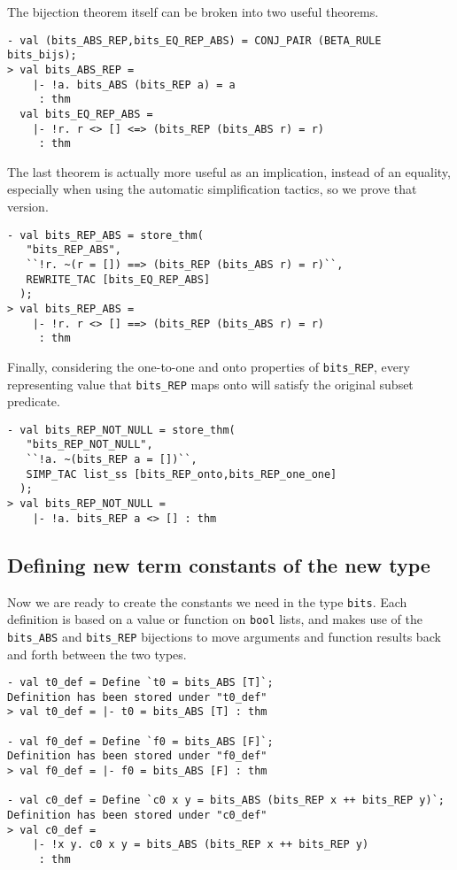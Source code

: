 The bijection theorem itself can be broken into two useful theorems.
%
\begin{session}
\begin{verbatim}
- val (bits_ABS_REP,bits_EQ_REP_ABS) = CONJ_PAIR (BETA_RULE bits_bijs);
> val bits_ABS_REP =
    |- !a. bits_ABS (bits_REP a) = a
     : thm
  val bits_EQ_REP_ABS =
    |- !r. r <> [] <=> (bits_REP (bits_ABS r) = r)
     : thm
\end{verbatim}
\end{session}

The last theorem is actually more useful as an implication, instead of an equality,
especially when using the automatic simplification tactics,
so we prove that version.
%
\begin{session}
\begin{verbatim}
- val bits_REP_ABS = store_thm(
   "bits_REP_ABS",
   ``!r. ~(r = []) ==> (bits_REP (bits_ABS r) = r)``,
   REWRITE_TAC [bits_EQ_REP_ABS]
  );
> val bits_REP_ABS =
    |- !r. r <> [] ==> (bits_REP (bits_ABS r) = r)
     : thm
\end{verbatim}
\end{session}

Finally, considering the
one-to-one and onto
properties of
\texttt{bits\_REP}, every representing value that \texttt{bits\_REP} maps onto will
satisfy the original subset predicate.
%
\begin{session}
\begin{verbatim}
- val bits_REP_NOT_NULL = store_thm(
   "bits_REP_NOT_NULL",
   ``!a. ~(bits_REP a = [])``,
   SIMP_TAC list_ss [bits_REP_onto,bits_REP_one_one]
  );
> val bits_REP_NOT_NULL =
    |- !a. bits_REP a <> [] : thm
\end{verbatim}
\end{session}

\subsection{Defining new term constants of the new type}

Now we are ready to create the constants we need in the type \texttt{bits}.
Each definition is based on a value or function on \texttt{bool} lists, and makes use of the
\texttt{bits\_ABS} and \texttt{bits\_REP} bijections to move arguments and function results
back and forth between the two types.
%
\begin{session}
\begin{verbatim}
- val t0_def = Define `t0 = bits_ABS [T]`;
Definition has been stored under "t0_def"
> val t0_def = |- t0 = bits_ABS [T] : thm

- val f0_def = Define `f0 = bits_ABS [F]`;
Definition has been stored under "f0_def"
> val f0_def = |- f0 = bits_ABS [F] : thm

- val c0_def = Define `c0 x y = bits_ABS (bits_REP x ++ bits_REP y)`;
Definition has been stored under "c0_def"
> val c0_def =
    |- !x y. c0 x y = bits_ABS (bits_REP x ++ bits_REP y)
     : thm
\end{verbatim}
\end{session}

